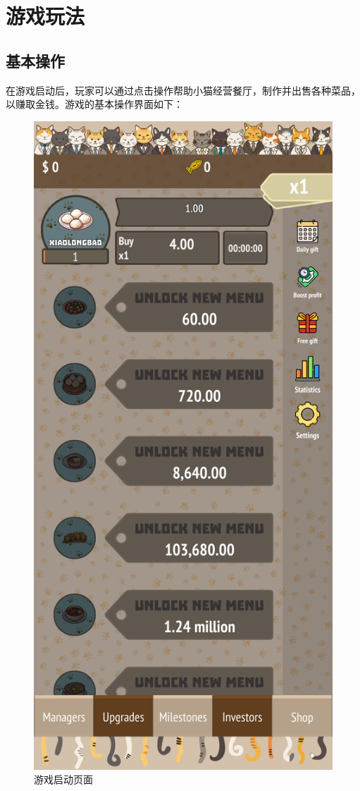 \documentclass{mancls}%
\begin{document}
\pagebreak
\section{游戏玩法}

\subsection{基本操作}

在游戏启动后，玩家可以通过点击操作帮助小猫经营餐厅，制作并出售各种菜品，以赚取金钱。游戏的基本操作界面如下：

\begin{figure}[h]
  \centering
  \includegraphics[height=0.6\textheight]{screenshots/PurrfectEats_004.png}
  \caption{游戏启动页面}
\end{figure}
\end{document}
